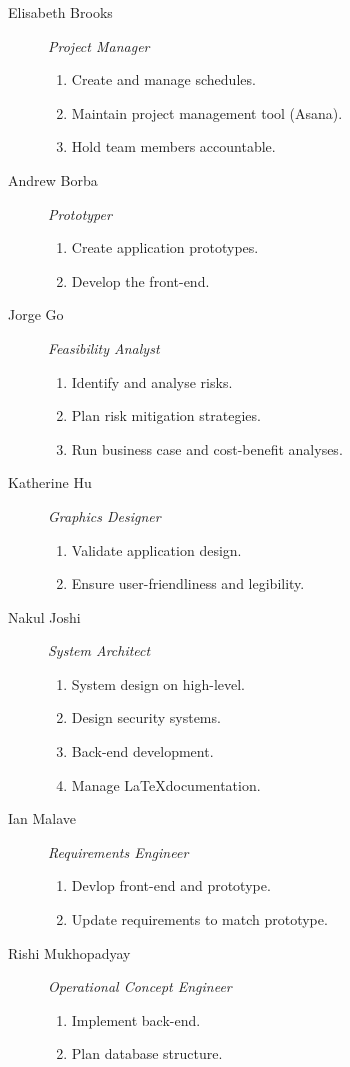\begin{description}

	\item[Elisabeth Brooks] \textit{Project Manager}\begin{enumerate}
		\item Create and manage schedules.
		\item Maintain project management tool (Asana).
		\item Hold team members accountable.
	\end{enumerate}
	
	\item[Andrew Borba] \textit{Prototyper}\begin{enumerate}
		\item Create application prototypes.
		\item Develop the front-end.
	\end{enumerate}
	
	\item[Jorge Go] \textit{Feasibility Analyst}\begin{enumerate}
		\item Identify and analyse risks.
		\item Plan risk mitigation strategies.
		\item Run business case and cost-benefit analyses.
	\end{enumerate}

	\item[Katherine Hu] \textit{Graphics Designer}\begin{enumerate}
		\item Validate application design.
		\item Ensure user-friendliness and legibility.
	\end{enumerate}
	
	\item[Nakul Joshi] \textit{System Architect}\begin{enumerate}
		\item System design on high-level.
		\item Design security systems.
		\item Back-end development.
		\item Manage \LaTeX  documentation.
	\end{enumerate}
	
	\item[Ian Malave] \textit{Requirements Engineer}\begin{enumerate}
		\item Devlop front-end and prototype.
		\item Update requirements to match prototype.
	\end{enumerate}
	
	\item[Rishi Mukhopadyay] \textit{Operational Concept Engineer}\begin{enumerate}
		\item Implement back-end.
		\item Plan database structure.
	\end{enumerate}
\end{description}